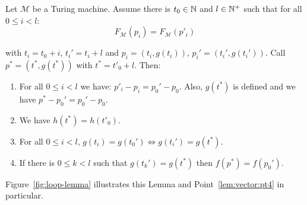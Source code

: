 \begin{lemma}\label{lem:vector} Let $\mathcal{M}$ be a Turing machine.
    Assume there is $ t_0 \in \mathbb{N}$ and $l \in \mathbb{N}^+$ such that
    for all $0 \leq i < l$: $$F_\mathcal{M}(p_i)   = F_\mathcal{M}(p'_i)$$

    \noindent with $t_i = t_0 + i$, $t_i' = t_i+l$ and $p_i = (t_i, g(t_i))$, $p_i' = (t_i', g(t_i'))$. Call $p^*=(t^*,g(t^*))$ with $t^*=t'_0 + l$. Then:
    \begin{enumerate}
        \item For all $0 \leq i < l$ we have: $p'_i - p_i = p_0' - p_0$. Also, $g(t^*)$ is defined and we have $p^* - p_0' = p_0' - p_0$. \label{lem:vector:pt1}
        \item We have $h(t^*) = h(t'_0)$.\label{lem:vector:pt2}
        \item For all  $0 \leq i < l$, $g(t_i) = g(t_0') \Leftrightarrow g(t_i') = g(t^*)$.\label{lem:vector:pt3}
        \item If there is $0 \leq k < l$ such that $g(t_k') = g(t^*)$ then $f(p^*) = f(p_0')$.\label{lem:vector:pt4}
    \end{enumerate}
    Figure~\ref{fig:loop-lemma} illustrates this Lemma and Point~\ref{lem:vector:pt4} in particular.
\end{lemma}

